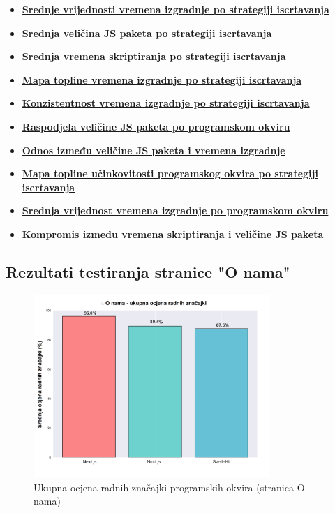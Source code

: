 \begin{itemize}
    \item \hyperref[fig:average_build_times_by_framework_and_strategy]{\textbf{Srednje vrijednosti vremena izgradnje po strategiji iscrtavanja}}
    \item \hyperref[fig:average_bundle_size_by_strategy]{\textbf{Srednja veličina JS paketa po strategiji iscrtavanja}}
    \item \hyperref[fig:average_scripting_performance_times]{\textbf{Srednja vremena skriptiranja po strategiji iscrtavanja}}
    \item \hyperref[fig:build_times_heat_map]{\textbf{Mapa topline vremena izgradnje po strategiji iscrtavanja}}
    \item \hyperref[fig:build_time_consistency]{\textbf{Konzistentnost vremena izgradnje po strategiji iscrtavanja}}
    \item \hyperref[fig:bundle_size_distribution_by_framework]{\textbf{Raspodjela veličine JS paketa po programskom okviru}}
    \item \hyperref[fig:bundle_size_vs_build_time_correlation]{\textbf{Odnos između veličine JS paketa i vremena izgradnje}}
    \item \hyperref[fig:framework_strategy_efficiency_matrix]{\textbf{Mapa topline učinkovitosti programskog okvira po strategiji iscrtavanja}}
    \item \hyperref[fig:overall_framework_build_performance]{\textbf{Srednja vrijednost vremena izgradnje po programskom okviru}}
    \item \hyperref[fig:performance_vs_bundle_size_tradeoff]{\textbf{Kompromis između vremena skriptiranja i veličine JS paketa}}
\end{itemize}

\subsection{Rezultati testiranja stranice "O nama"}
\label{sec:rezultati-o-nama}

\begin{figure}[H]
    \centering
    \includegraphics[width=0.8\textwidth]{slike/rezultati/about/about_framework_overall_performance.png}
    \caption{Ukupna ocjena radnih značajki programskih okvira (stranica O nama)}
    \label{fig:testiranje-o-nama-ukupne-performanse}
\end{figure}

